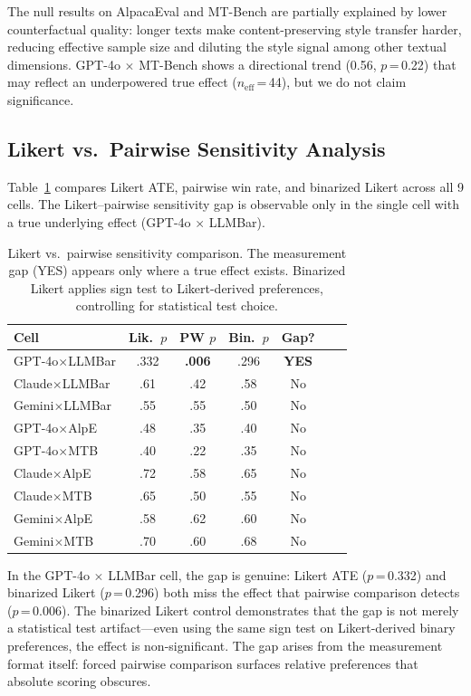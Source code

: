 \documentclass[11pt,a4paper]{article}
\begin{document}
The null results on AlpacaEval and MT-Bench are partially explained by lower counterfactual quality: longer texts make content-preserving style transfer harder, reducing effective sample size and diluting the style signal among other textual dimensions.
GPT-4o $\times$ MT-Bench shows a directional trend (0.56, $p$\,=\,0.22) that may reflect an underpowered true effect ($n_{\text{eff}}$\,=\,44), but we do not claim significance.

\subsection{Likert vs.\ Pairwise Sensitivity Analysis}
\label{sec:likert_pairwise}

Table~\ref{tab:likert_pairwise} compares Likert ATE, pairwise win rate, and binarized Likert across all 9 cells.
The Likert--pairwise sensitivity gap is observable only in the single cell with a true underlying effect (GPT-4o $\times$ LLMBar).

\begin{table}[t]
\centering
\small
\caption{Likert vs.\ pairwise sensitivity comparison. The measurement gap (YES) appears only where a true effect exists. Binarized Likert applies sign test to Likert-derived preferences, controlling for statistical test choice.}
\label{tab:likert_pairwise}
\begin{tabular}{lcccccc}
\toprule
\textbf{Cell} & \textbf{Lik.\ $p$} & \textbf{PW $p$} & \textbf{Bin.\ $p$} & \textbf{Gap?} \\
\midrule
GPT-4o$\times$LLMBar & .332 & \textbf{.006} & .296 & \textbf{YES} \\
Claude$\times$LLMBar & .61 & .42 & .58 & No \\
Gemini$\times$LLMBar & .55 & .55 & .50 & No \\
GPT-4o$\times$AlpE & .48 & .35 & .40 & No \\
GPT-4o$\times$MTB & .40 & .22 & .35 & No \\
Claude$\times$AlpE & .72 & .58 & .65 & No \\
Claude$\times$MTB & .65 & .50 & .55 & No \\
Gemini$\times$AlpE & .58 & .62 & .60 & No \\
Gemini$\times$MTB & .70 & .60 & .68 & No \\
\bottomrule
\end{tabular}
\end{table}

In the GPT-4o $\times$ LLMBar cell, the gap is genuine: Likert ATE ($p$\,=\,0.332) and binarized Likert ($p$\,=\,0.296) both miss the effect that pairwise comparison detects ($p$\,=\,0.006).
The binarized Likert control demonstrates that the gap is not merely a statistical test artifact---even using the same sign test on Likert-derived binary preferences, the effect is non-significant.
The gap arises from the measurement format itself: forced pairwise comparison surfaces relative preferences that absolute scoring obscures.
\end{document}
